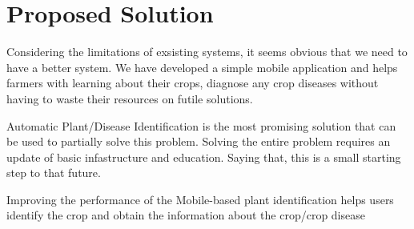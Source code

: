 \documentclass[../Report.tex]{subfiles}
\begin{document}
\section{Proposed Solution}
Considering the limitations of exsisting systems, it seems obvious that we need to have a better system. We have developed a simple 
mobile application and helps farmers with learning about their crops, diagnose any crop diseases without having to waste their resources
on futile solutions.\par
Automatic Plant/Disease Identification is the most promising solution that can be used to partially solve this problem. Solving the entire
problem requires an update of basic infastructure and education. Saying that, this is a small starting step to that future.\par
Improving the performance of the Mobile-based plant identification helps users identify the crop and obtain the information about the 
crop/crop disease\par
\end{document}
